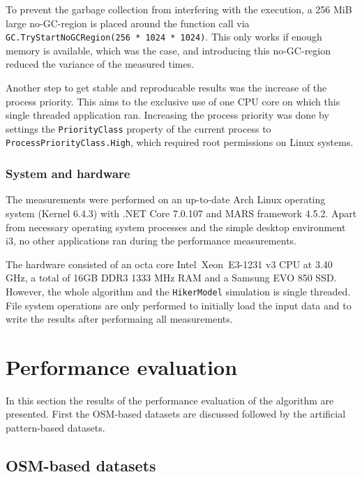 			To prevent the garbage collection from interfering with the execution, a 256 MiB large no-GC-region is placed around the function call via \texttt{GC.TryStartNoGCRegion(256 * 1024 * 1024)}.
			This only works if enough memory is available\cite{ms-no-gc-region}, which was the case, and introducing this no-GC-region reduced the variance of the measured times.
			
			Another step to get stable and reproducable results was the increase of the process priority.
			This aims to the exclusive use of one CPU core on which this single threaded application ran.
			Increasing the process priority was done by settings the \texttt{PriorityClass} property of the current process to \texttt{ProcessPriorityClass.High}, which required root permissions on Linux systems.
		
		\subsubsection{System and hardware}
		
			The measurements were performed on an up-to-date Arch Linux operating system (Kernel 6.4.3) with .NET Core 7.0.107 and MARS framework 4.5.2.
			Apart from necessary operating system processes and the simple desktop environment i3, no other applications ran during the performance measurements.
			
			The hardware consisted of an octa core Intel\textregistered\ Xeon\textregistered\ E3-1231 v3 CPU at 3.40 GHz, a total of 16GB DDR3 1333 MHz RAM and a Samsung EVO 850 SSD.
			However, the whole algorithm and the \texttt{HikerModel} simulation is single threaded.
			File system operations are only performed to initially load the input data and to write the results after performaing all measurements.
	
\section{Performance evaluation}

	In this section the results of the performance evaluation of the algorithm are presented.
	First the OSM-based datasets are discussed followed by the artificial pattern-based datasets.

	\subsection{OSM-based datasets}
		
